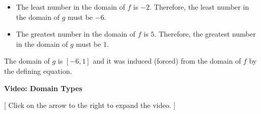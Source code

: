 \documentclass{ximera}
\begin{document}
\begin{enumerate}
\begin{itemize}
\item The least number in the domain of $f$ is $-2$.  Therefore, the least number in the domain of $g$ must be $-6$.
\item The greatest number in the domain of $f$ is $5$.  Therefore, the greatest number in the domain of $g$ must be $1$.
\end{itemize} 

The domain of $g$ is $[-6, 1]$ and it was induced (forced) from the domain of $f$ by the defining equation.


\end{enumerate}





\begin{explanation} \textbf{\textcolor{red!75!green}{Video: Domain Types}}

[ Click on the arrow to the right to expand the video. ]
\begin{expandable} 

\begin{center}
\end{center}

\end{expandable}
\end{explanation}
\end{document}
